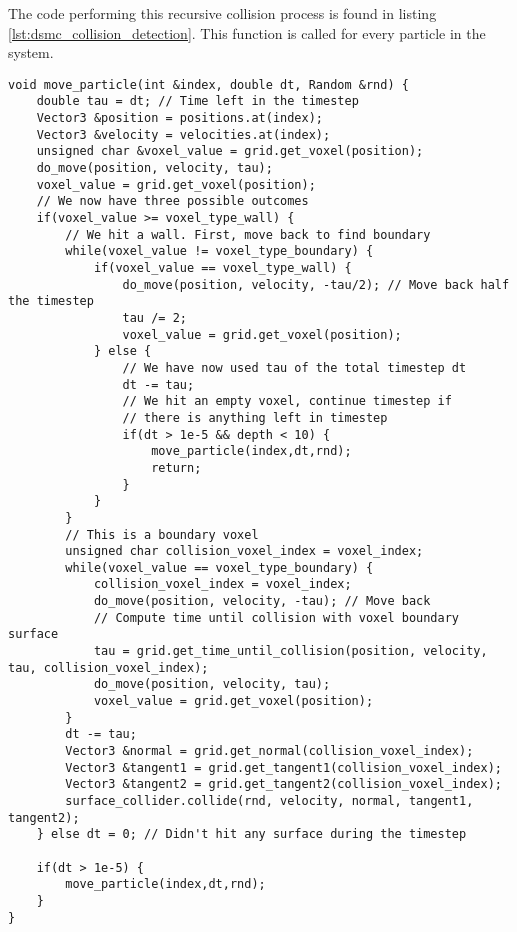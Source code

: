 The code performing this recursive collision process is found in listing \ref{lst:dsmc_collision_detection}. This function is called for every particle in the system.
\begin{lstlisting}[caption=The collision detection algorithm., label=lst:dsmc_collision_detection]
void move_particle(int &index, double dt, Random &rnd) {
    double tau = dt; // Time left in the timestep
    Vector3 &position = positions.at(index);
    Vector3 &velocity = velocities.at(index);
    unsigned char &voxel_value = grid.get_voxel(position);
    do_move(position, velocity, tau);
    voxel_value = grid.get_voxel(position);
    // We now have three possible outcomes
    if(voxel_value >= voxel_type_wall) {
        // We hit a wall. First, move back to find boundary
        while(voxel_value != voxel_type_boundary) {
            if(voxel_value == voxel_type_wall) {
                do_move(position, velocity, -tau/2); // Move back half the timestep
                tau /= 2;
                voxel_value = grid.get_voxel(position);
            } else {
                // We have now used tau of the total timestep dt
                dt -= tau;
                // We hit an empty voxel, continue timestep if
                // there is anything left in timestep
                if(dt > 1e-5 && depth < 10) {
                    move_particle(index,dt,rnd);
                    return;
                }
            }
        }
        // This is a boundary voxel
        unsigned char collision_voxel_index = voxel_index;
        while(voxel_value == voxel_type_boundary) {
            collision_voxel_index = voxel_index;
            do_move(position, velocity, -tau); // Move back
            // Compute time until collision with voxel boundary surface
            tau = grid.get_time_until_collision(position, velocity, tau, collision_voxel_index); 
            do_move(position, velocity, tau);
            voxel_value = grid.get_voxel(position);
        }
        dt -= tau;
        Vector3 &normal = grid.get_normal(collision_voxel_index);
        Vector3 &tangent1 = grid.get_tangent1(collision_voxel_index);
        Vector3 &tangent2 = grid.get_tangent2(collision_voxel_index);
        surface_collider.collide(rnd, velocity, normal, tangent1, tangent2);
    } else dt = 0; // Didn't hit any surface during the timestep

    if(dt > 1e-5) {
        move_particle(index,dt,rnd);
    }
}
\end{lstlisting}
